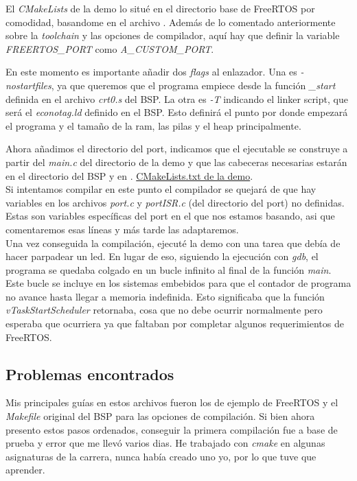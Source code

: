 El \emph{CMakeLists} de la demo lo situé en el directorio base de FreeRTOS por comodidad, basandome en el archivo . Además de lo comentado anteriormente sobre la \emph{toolchain} y las opciones de compilador, aquí hay que definir la variable \emph{FREERTOS\_PORT} como \emph{A\_CUSTOM\_PORT}.

En este momento es importante añadir dos \emph{flags} al enlazador. Una es \emph{-nostartfiles}, ya que queremos que el programa empiece desde la función \emph{\_start} definida en el archivo \emph{crt0.s} del BSP. La otra es \emph{-T} indicando el linker script, que será el \emph{econotag.ld} definido en el BSP. Esto definirá el punto por donde empezará el programa y el tamaño de la ram, las pilas y el heap principalmente.

Ahora añadimos el directorio del port, indicamos que el ejecutable se construye a partir del \emph{main.c} del directorio de la demo y que las cabeceras necesarias estarán en el directorio del BSP y en .
\href{https://github.com/epaubert/FreeRTOS-TFG/blob/main/FreeRTOS/CMakeLists.txt}{CMakeLists.txt de la demo}.\\

Si intentamos compilar en este punto el compilador se quejará de que hay variables en los archivos \emph{port.c} y \emph{portISR.c} (del directorio del port) no definidas. Estas son variables específicas del port en el que nos estamos basando, asi que comentaremos esas líneas y más tarde las adaptaremos.\\

Una vez conseguida la compilación, ejecuté la demo con una tarea que debía de hacer parpadear un led. En lugar de eso, siguiendo la ejecución con \emph{gdb}, el programa se quedaba colgado en un bucle infinito al final de la función \emph{main}. Este bucle se incluye en los sistemas embebidos para que el contador de programa no avance hasta llegar a memoria indefinida. Esto significaba que la función \emph{vTaskStartScheduler} retornaba, cosa que no debe ocurrir normalmente pero esperaba que ocurriera ya que faltaban por completar algunos requerimientos de FreeRTOS.

\subsection{Problemas encontrados}
Mis principales guías en estos archivos fueron los de ejemplo de FreeRTOS y el \emph{Makefile} original del BSP para las opciones de compilación. Si bien ahora presento estos pasos ordenados, conseguir la primera compilación fue a base de prueba y error que me llevó varios dias. He trabajado con \emph{cmake} en algunas asignaturas de la carrera, nunca había creado uno yo, por lo que tuve que aprender.

